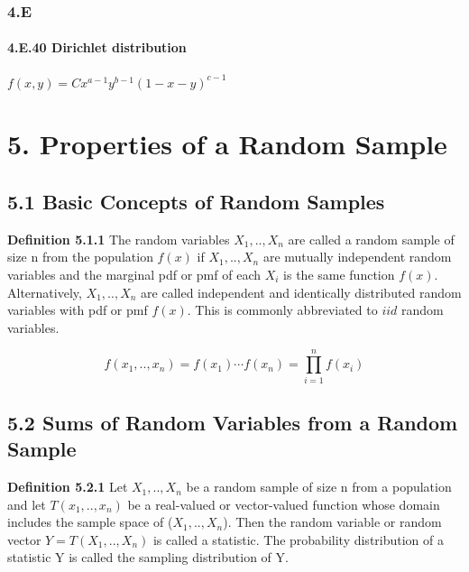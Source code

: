 \documentclass[6pt,Portrait]{article}
\let\oldparagraph\paragraph
\renewcommand{\paragraph}[1]{\oldparagraph{#1}\mbox{}}
\begin{document}
\hypertarget{e-1}{%
\subsubsection{4.E}\label{e-1}}

\hypertarget{Dirichlet}{%
\paragraph{4.E.40 Dirichlet distribution}\label{Dirichlet}}

\(f(x,y)=Cx^{a-1}y^{b-1}(1-x-y)^{c-1}\)

\hypertarget{samp}{%
\section{5. Properties of a Random Sample}\label{samp}}

\hypertarget{basic-concepts-of-random-samples}{%
\subsection{5.1 Basic Concepts of Random
Samples}\label{basic-concepts-of-random-samples}}

\textbf{Definition 5.1.1} The random variables \(X_1,..,X_n\) are called
a random sample of size n from the population \(f(x)\) if \(X_1,..,X_n\)
are mutually independent random variables and the marginal pdf or pmf of
each \(X_i\) is the same function \(f(x)\). Alternatively,
\(X_1,..,X_n\) are called independent and identically distributed random
variables with pdf or pmf \(f(x)\). This is commonly abbreviated to
\(iid\) random variables.

\[f(x_1,..,x_n) =f(x_1)\cdots f(x_n)=\prod_{i=1}^nf(x_i)\]

\hypertarget{sums-of-random-variables-from-a-random-sample}{%
\subsection{5.2 Sums of Random Variables from a Random
Sample}\label{sums-of-random-variables-from-a-random-sample}}

\textbf{Definition 5.2.1} Let \(X_1,..,X_n\) be a random sample of size
n from a population and let \(T(x_1,..,x_n)\) be a real-valued or
vector-valued function whose domain includes the sample space of
(\(X_1,..,X_n\)). Then the random variable or random vector
\(Y=T(X_1,..,X_n)\) is called a statistic. The probability distribution
of a statistic Y is called the sampling distribution of Y.
\end{document}

